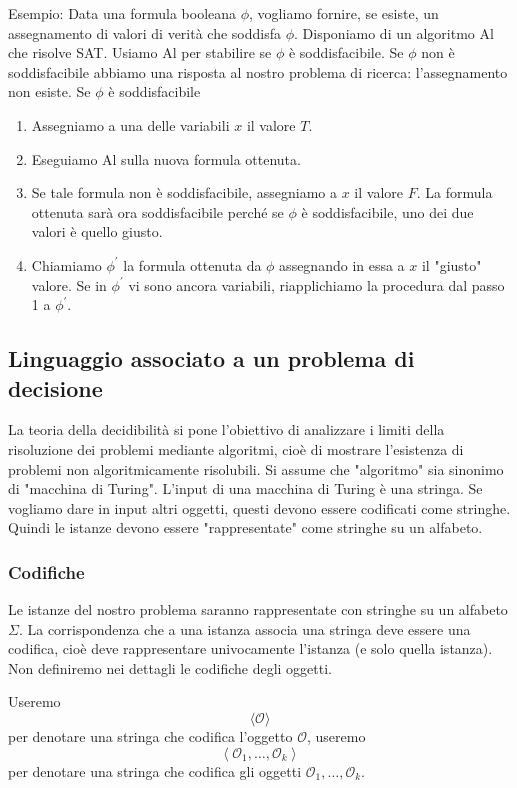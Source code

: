 Esempio: Data una formula booleana $\phi$, vogliamo fornire, se esiste, un assegnamento di valori di verità che soddisfa $\phi$. Disponiamo di un algoritmo Al che risolve SAT. Usiamo Al per stabilire se $\phi$ è soddisfacibile. Se $\phi$ non è soddisfacibile abbiamo una risposta al nostro problema di ricerca: l'assegnamento non esiste. Se $\phi$ è soddisfacibile
\begin{enumerate}
    \item Assegniamo a una delle variabili $x$ il valore $T$.
    \item Eseguiamo Al sulla nuova formula ottenuta.
    \item Se tale formula non è soddisfacibile, assegniamo a $x$ il valore $F$. La formula ottenuta sarà ora soddisfacibile perché se $\phi$ è soddisfacibile, uno dei due valori è quello giusto.
    \item Chiamiamo $\phi^{\prime}$ la formula ottenuta da $\phi$ assegnando in essa a $x$ il "giusto" valore. Se in $\phi^{\prime}$ vi sono ancora variabili, riapplichiamo la procedura dal passo 1 a $\phi^{\prime}$.
\end{enumerate}

\subsection{Linguaggio associato a un problema di
decisione}

La teoria della decidibilità si pone l'obiettivo di analizzare i
limiti della risoluzione dei problemi mediante algoritmi, cioè di
mostrare l'esistenza di problemi non algoritmicamente
risolubili.
Si assume che "algoritmo" sia sinonimo di "macchina di
Turing".
L'input di una macchina di Turing è una stringa. Se vogliamo
dare in input altri oggetti, questi devono essere codificati
come stringhe.
Quindi le istanze devono essere "rappresentate" come stringhe
su un alfabeto.

\subsubsection{Codifiche}

Le istanze del nostro problema saranno rappresentate con stringhe su un alfabeto $\Sigma$.
La corrispondenza che a una istanza associa una stringa deve essere una codifica, cioè deve rappresentare univocamente l'istanza (e solo quella istanza).
Non definiremo nei dettagli le codifiche degli oggetti.

Useremo
$$
\langle\mathcal{O}\rangle
$$
per denotare una stringa che codifica l'oggetto $\mathcal{O}$, useremo
$$
\left\langle\mathcal{O}_{1}, \ldots, \mathcal{O}_{k}\right\rangle
$$
per denotare una stringa che codifica gli oggetti $\mathcal{O}_{1}, \ldots, \mathcal{O}_{k}$.

